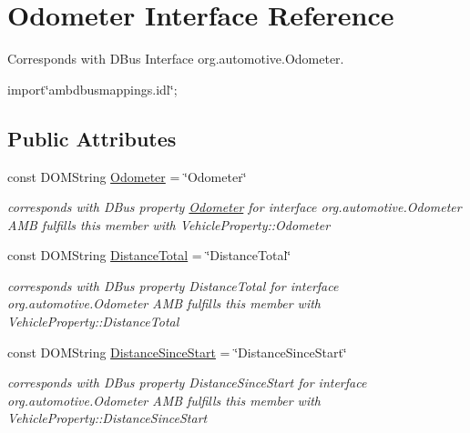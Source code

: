 \hypertarget{interfaceOdometer}{\section{Odometer Interface Reference}
\label{interfaceOdometer}
}


Corresponds with D\+Bus Interface org.\+automotive.\+Odometer.  




{\ttfamily import\char`\"{}ambdbusmappings.\+idl\char`\"{};}

\subsection*{Public Attributes}
\begin{DoxyCompactItemize}
\item 
\hypertarget{interfaceOdometer_a64dd4e3b27833d0b6a3668ad518c6a8a}{const D\+O\+M\+String \hyperlink{interfaceOdometer_a64dd4e3b27833d0b6a3668ad518c6a8a}{Odometer} = \char`\"{}Odometer\char`\"{}}\label{interfaceOdometer_a64dd4e3b27833d0b6a3668ad518c6a8a}

\begin{DoxyCompactList}\small\item\em corresponds with D\+Bus property \hyperlink{interfaceOdometer}{Odometer} for interface org.\+automotive.\+Odometer A\+M\+B fulfills this member with Vehicle\+Property\+::\+Odometer \end{DoxyCompactList}\item 
\hypertarget{interfaceOdometer_a3157bd000bfd509e9fd6d7c09b6e36ff}{const D\+O\+M\+String \hyperlink{interfaceOdometer_a3157bd000bfd509e9fd6d7c09b6e36ff}{Distance\+Total} = \char`\"{}Distance\+Total\char`\"{}}\label{interfaceOdometer_a3157bd000bfd509e9fd6d7c09b6e36ff}

\begin{DoxyCompactList}\small\item\em corresponds with D\+Bus property Distance\+Total for interface org.\+automotive.\+Odometer A\+M\+B fulfills this member with Vehicle\+Property\+::\+Distance\+Total \end{DoxyCompactList}\item 
\hypertarget{interfaceOdometer_a0dd9d3f98892d11aadae694841237054}{const D\+O\+M\+String \hyperlink{interfaceOdometer_a0dd9d3f98892d11aadae694841237054}{Distance\+Since\+Start} = \char`\"{}Distance\+Since\+Start\char`\"{}}\label{interfaceOdometer_a0dd9d3f98892d11aadae694841237054}

\begin{DoxyCompactList}\small\item\em corresponds with D\+Bus property Distance\+Since\+Start for interface org.\+automotive.\+Odometer A\+M\+B fulfills this member with Vehicle\+Property\+::\+Distance\+Since\+Start \end{DoxyCompactList}\end{DoxyCompactItemize}


